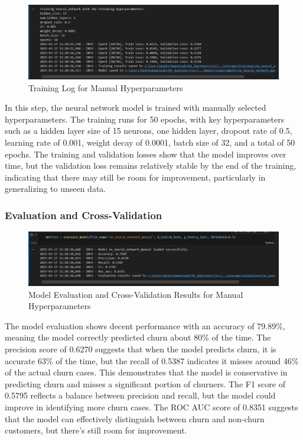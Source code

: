 \begin{figure}[hbt!]
    \centering
    \includegraphics[width=1\linewidth]{Images/5.5.a.jpg}
    \caption{Training Log for Manual Hyperparameters }
    \label{fig:enter-label}
\end{figure}

In this step, the neural network model is trained with manually selected hyperparameters. The training runs for 50 epochs, with key hyperparameters such as a hidden layer size of 15 neurons, one hidden layer, dropout rate of 0.5, learning rate of 0.001, weight decay of 0.0001, batch size of 32, and a total of 50 epochs. The training and validation losses show that the model improves over time, but the validation loss remains relatively stable by the end of the training, indicating that there may still be room for improvement, particularly in generalizing to unseen data.
\subsubsection{Evaluation and Cross-Validation}

\begin{figure}[hbt!]
    \centering
    \includegraphics[width=1\linewidth]{Images/5.5.1.a.jpg}
    \caption{Model Evaluation and Cross-Validation Results for Manual Hyperparameters}
    \label{fig:enter-label}
\end{figure}

The model evaluation shows decent performance with an accuracy of 79.89\%, meaning the model correctly predicted churn about 80\% of the time. The precision score of 0.6270 suggests that when the model predicts churn, it is accurate 63\% of the time, but the recall of 0.5387 indicates it misses around 46\% of the actual churn cases. This demonstrates that the model is conservative in predicting churn and misses a significant portion of churners. The F1 score of 0.5795 reflects a balance between precision and recall, but the model could improve in identifying more churn cases. The ROC AUC score of 0.8351 suggests that the model can effectively distinguish between churn and non-churn customers, but there’s still room for improvement.\\

